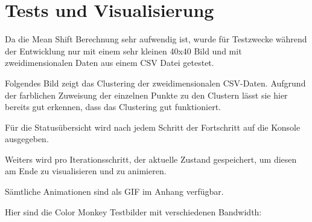 \section{Tests und Visualisierung}

Da die Mean Shift Berechnung sehr aufwendig ist, wurde für Testzwecke während der Entwicklung nur mit einem sehr kleinen 40x40 Bild und mit zweidimensionalen Daten aus einem CSV Datei getestet.


Folgendes Bild zeigt das Clustering der zweidimensionalen CSV-Daten. Aufgrund der farblichen Zuweisung der einzelnen Punkte zu den Clustern lässt sie hier bereits gut erkennen, dass das Clustering gut funktioniert.


Für die Statusübersicht wird nach jedem Schritt der Fortschritt auf die Konsole ausgegeben.



Weiters wird pro Iterationsschritt, der aktuelle Zustand gespeichert, um diesen am Ende zu visualisieren und zu animieren.

Sämtliche Animationen sind als GIF im Anhang verfügbar.


Hier sind die Color Monkey Testbilder mit verschiedenen Bandwidth:

\begin{minipage}[t]{0.23\textwidth}
\end{minipage}
%
\begin{minipage}[t]{0.23\textwidth}
\end{minipage}
%
\begin{minipage}[t]{0.23\textwidth}
\end{minipage}
%
\begin{minipage}[t]{0.23\textwidth}
\end{minipage}



